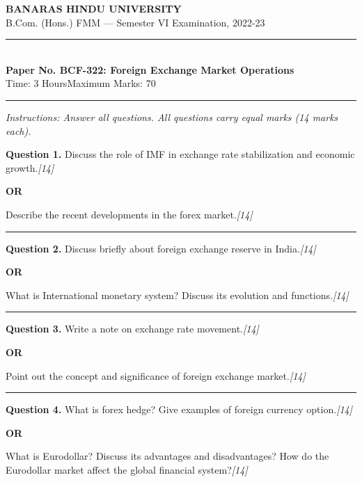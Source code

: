 \documentclass[11pt,a4paper]{article}
\newcommand{\pts}[1]{\hfill   \textit{[#1]}}
\begin{document}
\begin{center}
  {\large\bfseries BANARAS HINDU UNIVERSITY}\\[2pt]
  {\normalsize B.Com. (Hons.) FMM --- Semester VI Examination, 2022-23}\\[6pt]
  \rule{0.8\linewidth}{0.5pt}\\[6pt]
  {\large\bfseries Paper No. BCF-322: Foreign Exchange Market Operations}\\[4pt]
  {\normalsize Time: 3 Hours\hfill Maximum Marks: 70}
\end{center}

\rule{\linewidth}{0.4pt}

\smallskip



\noindent   \textit{Instructions: Answer all questions. All questions carry equal marks (14 marks each).}

\bigskip




\noindent   \textbf{Question 1.}
Discuss the role of IMF in exchange rate stabilization and economic growth.\pts{14}

\centerline{   \textbf{OR}}

Describe the recent developments in the forex market.\pts{14}

\medskip\rule{\linewidth}{0.2pt}




\noindent   \textbf{Question 2.}
Discuss briefly about foreign exchange reserve in India.\pts{14}

\centerline{   \textbf{OR}}

What is International monetary system? Discuss its evolution and functions.\pts{14}

\medskip\rule{\linewidth}{0.2pt}




\noindent   \textbf{Question 3.}
Write a note on exchange rate movement.\pts{14}

\centerline{   \textbf{OR}}

Point out the concept and significance of foreign exchange market.\pts{14}

\medskip\rule{\linewidth}{0.2pt}




\noindent   \textbf{Question 4.}
What is forex hedge? Give examples of foreign currency option.\pts{14}

\centerline{   \textbf{OR}}

What is Eurodollar? Discuss its advantages and disadvantages? How do the Eurodollar market affect the global financial system?\pts{14}
\end{document}
